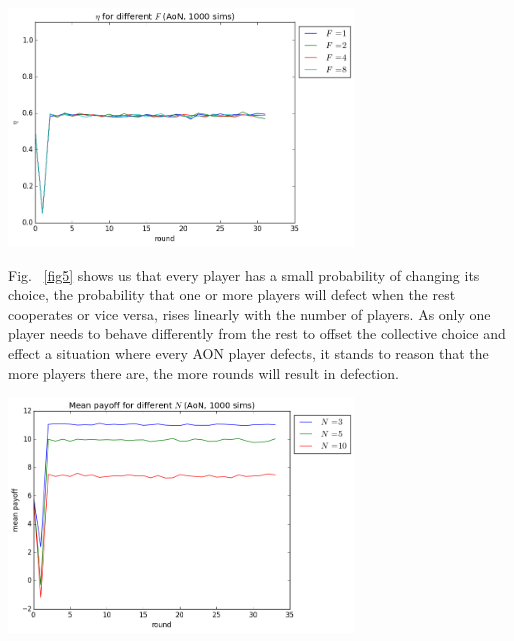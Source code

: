 \documentclass[letterpaper]{article}
\begin{document}
\vspace{5 mm}
\includegraphics[width=3.6in,angle=0]{img/cfraction_F_aon.png}
\label{fig4}
\vspace{5 mm}


Fig. ~\ref{fig5} shows us that every player has a small probability of changing its choice, the probability that one or more players will defect when the rest cooperates or vice versa, rises linearly with the number of players. As only one player needs to behave differently from the rest to offset the collective choice and effect a situation where every AON player defects, it stands to reason that the more players there are, the more rounds will result in defection.
\vspace{5 mm}


\includegraphics[width=3.6in,angle=0]{img/meanpayoff_N_aon.png}
\label{fig5}
\vspace{5 mm}
\end{document}
